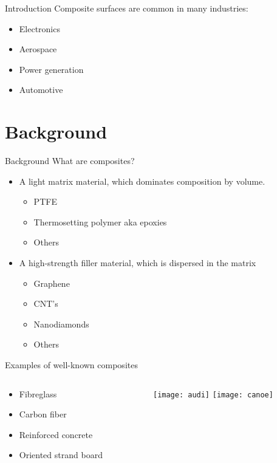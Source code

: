 \documentclass[12pt,letterpaper]{beamer}
\begin{document}
\begin{frame}{Introduction}
Composite surfaces are common in many industries:
\begin{itemize}
\item Electronics
\item Aerospace
\item Power generation
\item Automotive
\end{itemize}
\end{frame}

\section{Background}

\begin{frame}{Background}
What are composites?
\begin{itemize}
\item A light matrix material, which dominates composition by volume.
\begin{itemize}
\item PTFE
\item Thermosetting polymer aka epoxies
\item Others
\end{itemize}
\item A high-strength filler material, which is dispersed in the matrix
\begin{itemize}
\item Graphene
\item CNT's
\item Nanodiamonds
\item Others
\end{itemize}
\end{itemize}
\end{frame}

\begin{frame}{Examples of well-known composites}
  \begin{columns}[T]
    \begin{column}{.5\textwidth}
     \begin{block}{}
\begin{itemize}
\item Fibreglass
\item Carbon fiber
\item Reinforced concrete
\item Oriented strand board
\end{itemize}    
    \end{block}
    \end{column}
    \begin{column}{.5\textwidth}
    \begin{block}{}
\texttt{[image: audi]}
\vspace{1cm}
\texttt{[image: canoe]}
    \end{block}
    \end{column}
  \end{columns}
\end{frame}
\end{document}
